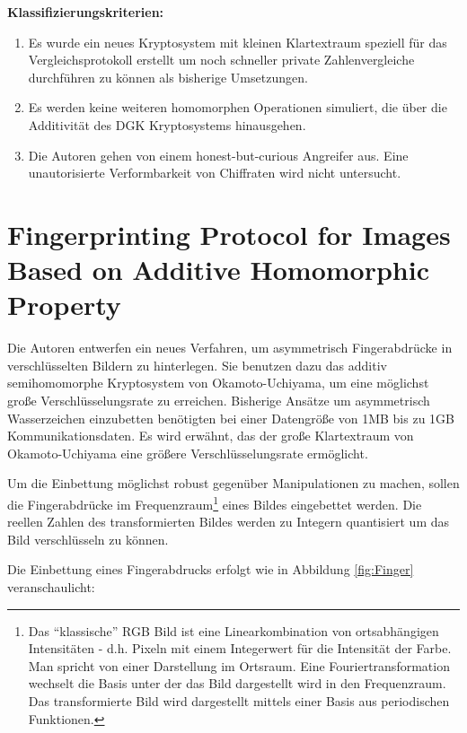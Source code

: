 \textbf{Klassifizierungskriterien:}
\begin{enumerate}
	\item Es wurde ein neues Kryptosystem mit kleinen Klartextraum speziell für das Vergleichsprotokoll erstellt um noch schneller private Zahlenvergleiche durchführen zu können als bisherige Umsetzungen. 
	\item Es werden keine weiteren homomorphen Operationen simuliert, die über die Additivität des DGK Kryptosystems hinausgehen.
	\item %
	Die Autoren gehen von einem honest-but-curious Angreifer aus.  Eine unautorisierte Verformbarkeit von Chiffraten wird nicht untersucht.
\end{enumerate}

\section{Fingerprinting Protocol for Images Based on Additive Homomorphic Property \cite{kuribayashi2005fingerprinting}}
\label{FPI}
Die Autoren entwerfen ein neues Verfahren, um asymmetrisch Fingerabdrücke in verschlüsselten Bildern zu hinterlegen. Sie benutzen dazu das additiv semihomomorphe Kryptosystem von Okamoto-Uchiyama, um eine möglichst große Verschlüsselungsrate zu erreichen. Bisherige Ansätze um asymmetrisch Wasserzeichen einzubetten benötigten bei einer Datengröße von 1MB bis zu 1GB Kommunikationsdaten. Es wird erwähnt, das der große Klartextraum von Okamoto-Uchiyama eine größere Verschlüsselungsrate ermöglicht.

Um die Einbettung möglichst robust gegenüber Manipulationen zu machen, sollen die Fingerabdrücke im Frequenzraum\footnote{Das \enquote{klassische} RGB Bild ist eine Linearkombination von ortsabhängigen Intensitäten - d.h. Pixeln mit einem Integerwert für die Intensität der Farbe. Man spricht von einer Darstellung im Ortsraum. Eine Fouriertransformation wechselt die Basis unter der das Bild dargestellt wird in den Frequenzraum. Das transformierte Bild wird dargestellt mittels einer Basis aus periodischen Funktionen.} eines Bildes eingebettet werden. Die reellen Zahlen des transformierten Bildes werden zu Integern quantisiert um das Bild verschlüsseln zu können.

Die Einbettung eines Fingerabdrucks erfolgt wie in Abbildung \ref{fig:Finger} veranschaulicht:

